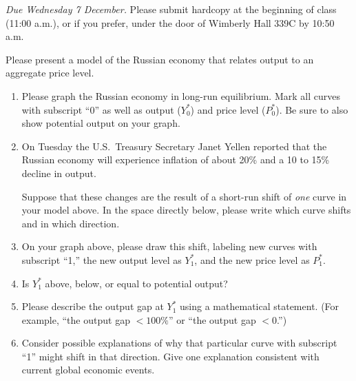 \documentclass{assignment}
\date{Friday 2 December 2022}
\begin{document}
\RaggedRight

\beginassignment{}

\emph{Due Wednesday 7 December.} Please submit hardcopy at the beginning of class (11:00 a.m.), or if you prefer, under the door of Wimberly Hall 339C by 10:50 a.m.

\ornamentalrule

Please present a model of the Russian economy that relates output to an aggregate price level.

\begin{enumerate}

\item Please graph the Russian economy in long-run equilibrium. Mark all curves with subscript ``0'' as well as output ($Y^*_0$) and price level ($P^*_0$). Be sure to also show potential output on your graph.

\vfill

\item On Tuesday the U.S.~Treasury Secretary Janet Yellen reported that the Russian economy will experience inflation of about 20\% and a 10 to 15\% decline in output.

Suppose that these changes are the result of a short-run shift of \emph{one} curve in your model above. In the space directly below, please write which curve shifts and in which direction.

\vspace{3.0\baselineskip}

\clearpage

\item On your graph above, please draw this shift, labeling new curves with subscript ``1,'' the new output level as $Y^*_1$, and the new price level as $P^*_1$.

\item Is $Y^*_1$ above, below, or equal to potential output?

\vspace{3.0\baselineskip}

\item Please describe the output gap at $Y^*_1$ using a mathematical statement. (For example, ``the output gap $<100\%$'' or ``the output gap $<0$.'')

\vspace{4.0\baselineskip}

\item Consider possible explanations of why that particular curve with subscript ``1'' might shift in that direction. Give one explanation consistent with current global economic events.


\end{enumerate}
\end{document}
